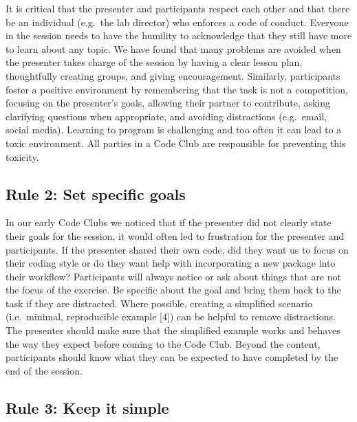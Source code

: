 \documentclass[
  11pt,
]{article}
\begin{document}
It is critical that the presenter and participants respect each other
and that there be an individual (e.g.~the lab director) who enforces a
code of conduct. Everyone in the session needs to have the humility to
acknowledge that they still have more to learn about any topic. We have
found that many problems are avoided when the presenter takes charge of
the session by having a clear lesson plan, thoughtfully creating groups,
and giving encouragement. Similarly, participants foster a positive
environment by remembering that the task is not a competition, focusing
on the presenter's goals, allowing their partner to contribute, asking
clarifying questions when appropriate, and avoiding distractions
(e.g.~email, social media). Learning to program is challenging and too
often it can lead to a toxic environment. All parties in a Code Club are
responsible for preventing this toxicity.

\hypertarget{rule-2-set-specific-goals}{%
\subsection{Rule 2: Set specific
goals}\label{rule-2-set-specific-goals}}

In our early Code Clubs we noticed that if the presenter did not clearly
state their goals for the session, it would often led to frustration for
the presenter and participants. If the presenter shared their own code,
did they want us to focus on their coding style or do they want help
with incorporating a new package into their workflow? Participants will
always notice or ask about things that are not the focus of the
exercise. Be specific about the goal and bring them back to the task if
they are distracted. Where possible, creating a simplified scenario
(i.e.~minimal, reproducible example {[}4{]}) can be helpful to remove
distractions. The presenter should make sure that the simplified example
works and behaves the way they expect before coming to the Code Club.
Beyond the content, participants should know what they can be expected
to have completed by the end of the session.

\hypertarget{rule-3-keep-it-simple}{%
\subsection{Rule 3: Keep it simple}\label{rule-3-keep-it-simple}}
\end{document}
